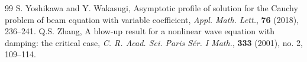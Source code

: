 \documentclass[10pt]{article}
\newcommand{\<}{\langle}
\renewcommand{\>}{\rangle}
\numberwithin{equation}{section}
\begin{document}
\begin{thebibliography}{99}
S. Yoshikawa and Y. Wakasugi, Asymptotic profile of solution for the Cauchy problem of beam equation with variable coefficient, \textit{Appl. Math. Lett.}, \textbf{76} (2018), 236--241.
Q.S. Zhang, A blow-up result for a nonlinear wave equation with damping: the critical case, \textit{C. R. Acad. Sci. Paris S\'{e}r. I Math.}, \textbf{333} (2001), no. 2, 109--114.
\end{thebibliography}
\end{document}
